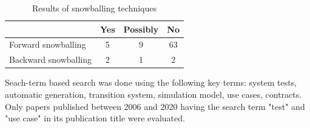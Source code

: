 \begin{table}[h] 
	\centering
	\begin{small}
		\caption{Results of snowballing techniques}
		\label{snowballing}
		\setlength{\tabcolsep}{1em}
		\begin{tabular}{l|c|c|c}
			\hline
			& \textbf{Yes} & \textbf{Possibly} & \textbf{No} \\
			\hline
			\hline	
			Forward snowballing & 5 & 9 & 63 \\
			\hline
			Backward snowballing & 2 & 1 & 2 \\
			\hline
		\end{tabular}
	\end{small}
\end{table}

Seach-term based search was done using the following key terms: system tests, automatic generation, transition system, simulation model, use cases, contracts. Only papers published between 2006 and 2020 having the search term "test" and "use case" in its publication title were evaluated. 

